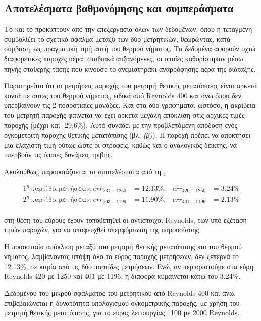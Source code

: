 \begin{refsection}
\section*{Αποτελέσματα βαθμονόμησης και συμπεράσματα}

\noindent Το  και το  προκύπτουν από την επεξεργασία όλων των δεδομένων, όπου η τεταγμένη συμβολίζει το σχετικό σφάλμα μεταξύ των δύο μετρητικών, θεωρώντας, κατά σύμβαση, ως πραγματική τιμή αυτή του θερμού νήματος. Τα δεδομένα αφορούν οχτώ διαφορετικές παροχές αέρα, σταδιακά αυξανόμενες, οι οποίες καθορίστηκαν μέσω πηγής σταθερής τάσης που κινούσε το ανεμιστηράκι αναρρόφησης αέρα της διάταξης.

Παρατηρείται ότι οι μετρήσεις παροχής του μετρητή θετικής μετατόπισης είναι αρκετά κοντά με αυτές του θερμού νήματος, ειδικά από Reynolds 400 και άνω όπου δεν υπερβαίνουν τις 2 ποσοστιαίες μονάδες. Και στα δύο γραφήματα, ωστόσο, η ακρίβεια του μετρητή παροχής φαίνεται να έχει αρκετά μεγάλη απόκλιση στις αρχικές τιμές παροχής (μέχρι και -29,6\%). Αυτό συνάδει με την προβλεπόμενη απόδοση ενός ογκομετριτή παροχής θετικής μετατόπισης (βλ.  \textit{(β)}). Η παροχή πρέπει να αποκτήσει μια ελάχιστη τιμή ούτως ώστε οι στροφείς, καθώς και ο αναλογικός δείκτης, να υπερβούν τις όποιες δυνάμεις τριβής.

Ακολούθως, παρουσιάζονται τα αποτελέσματα από τη ,

\begin{align*}
1^{\eta}\, \text{παρτίδα μετήσεων}: err_{231 - 1250} &= 12.13\%, & err_{420 - 1250} &= 3.24\% \\
2^{\eta}\, \text{παρτίδα μετήσεων}: err_{203 - 1196} &= 11.90\%, & err_{401 - 1196} &= 2.13\% \\
\end{align*}

\noindent στη θέση του εύρους έχουν τοποθετηθεί οι αντίστοιχοι Reynolds, των υπό εξέταση τιμών παροχών, για να αποφευχθεί υπερφόρτωση της παρουσίασης.

Η ποσοστιαία απόκλιση μεταξύ του μετρητή θετικής μετατόπισης και του θερμού νήματος, λαμβάνοντας υπόψη όλο το εύρος παροχής μετρήσεων, δεν ξεπερνά το 12.13\%, σε καμία από τις δύο παρτίδες μετρήσεων. Ενώ, αν περιοριστούμε στα εύρη Reynolds 420 με 1250 και 401 με 1196, η διαφορά κυμαίνεται κάτω του 3.24\%.

Δεδομένου του μικρού σφάλματος του μετρητικού από Reynolds 400 και άνω, επιβεβαιώνεται η δυνατότητα υπολογισμού ογκομετρικής παροχής, με χρήση του μετρητή θετικής μετατόπισης, για το εύρος λειτουργίας 1100 με 2000 Reynolds.


\end{refsection}
